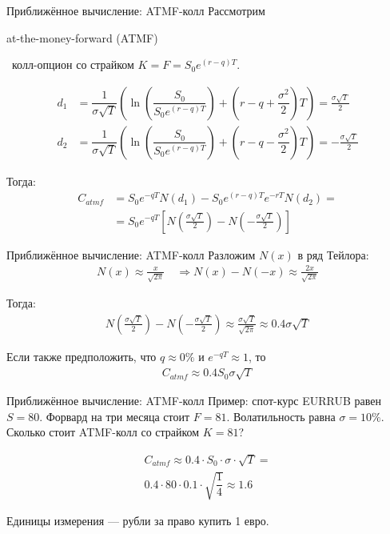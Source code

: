 \documentclass{beamer}
\newcommand{\en}[1]{\begin{otherlanguage}{english}#1\end{otherlanguage}}
\begin{document}
\begin{frame}{Приближённое вычисление: ATMF-колл}
\justify
Рассмотрим \en{at-the-money-forward (ATMF)}\ колл-опцион со страйком $K = F = S_0e^{(r-q)T}$.

\begin{align*}
d_1 &= \dfrac{1}{\sigma\sqrt{T}}\left( \ln\left(\dfrac{S_0}{S_0e^{(r-q)T}}\right) + \left(r -q + \dfrac{\sigma^2}{2}\right)T\right) = \frac{\sigma \sqrt{T}}{2} \\
d_2 &= \dfrac{1}{\sigma\sqrt{T}}\left( \ln\left(\dfrac{S_0}{S_0e^{(r-q)T}}\right) + \left(r -q- \dfrac{\sigma^2}{2}\right)T\right) = -\frac{\sigma \sqrt{T}}{2}
\end{align*}

Тогда:
\begin{align*}
C_{atmf} &= S_0e^{-qT}N(d_1) - S_0e^{(r-q)T}e^{-rT}N(d_2) = \\
&= S_0e^{-qT}\left[
N\left(\frac{\sigma \sqrt{T}}{2}\right) - N\left(-\frac{\sigma \sqrt{T}}{2}\right)
\right]
\end{align*}
\end{frame}



\begin{frame}{Приближённое вычисление: ATMF-колл}
\justify
Разложим $N(x)$ в ряд Тейлора:
\begin{align*}
N(x) \approx \frac{x}{\sqrt{2\pi}} \quad \Rightarrow
N(x) - N(-x) \approx \frac{2x}{\sqrt{2\pi}}
\end{align*}

Тогда:
\begin{align*}
N\left(\frac{\sigma \sqrt{T}}{2}\right) - N\left(-\frac{\sigma \sqrt{T}}{2}\right)
\approx
\frac{\sigma\sqrt{T}}{\sqrt{2\pi}}
\approx
0.4\sigma\sqrt{T}
\end{align*}

Если также предположить, что $q\approx 0\%$ и $e^{-qT} \approx 1$, то
\begin{align*}
C_{atmf} \approx 0.4 S_0 \sigma \sqrt{T}
\end{align*}
\end{frame}



\begin{frame}{Приближённое вычисление: ATMF-колл}
\justify
Пример: спот-курс EURRUB равен $S=80$. Форвард на три месяца стоит $F=81$. Волатильность равна $\sigma=10\%$. Сколько стоит ATMF-колл со страйком $K=81$?

\begin{align*}
C_{atmf} \approx 0.4 \cdot S_0 \cdot \sigma \cdot \sqrt{T} = \\
0.4 \cdot 80 \cdot 0.1 \cdot \sqrt{\dfrac{1}{4}} \approx 1.6
\end{align*}

Единицы измерения --- рубли за право купить 1 евро.
\end{frame}
\end{document}
